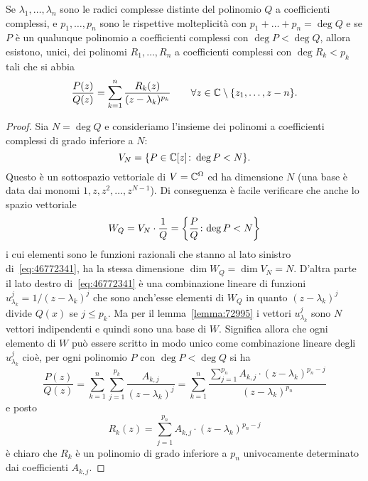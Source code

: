 \begin{theorem}
\label{th:fratti_semplici_complessi}%
%
%
%
Se $\lambda_1, \dots, \lambda_n$ sono le radici complesse
distinte del polinomio $Q$ a coefficienti complessi,
e $p_1,\dots, p_n$ sono le rispettive molteplicità
con $p_1 + \dots + p_n = \deg Q$
e se $P$ è un qualunque polinomio a coefficienti complessi
con $\deg P < \deg Q$,
allora esistono, unici, dei polinomi $R_1, \dots, R_n$
a coefficienti complessi con $\deg R_k < p_k$ tali che
si abbia
\begin{equation}\label{eq:46772341}
  \frac{P(z)}{Q(z)}
  = \sum_{k=1}^n \frac{R_k(z)}{(z-\lambda_k)^{p_k}}
  \qquad \forall z \in \mathbb C\setminus{\left\{ z_1,\dots,z-n \right\}}.
\end{equation}
\end{theorem}
%
\begin{proof}
Sia $N=\deg Q$ e consideriamo
l'insieme dei polinomi a coefficienti complessi
di grado inferiore a $N$:
\[
  V_N = {\left\{ P\in \mathbb C[z]\colon \deg P < N \right\}}.
\]
Questo è un sottospazio vettoriale di
$V=\mathbb C^\Omega$ ed ha dimensione
$N$ (una base è data dai monomi $1, z, z^2, \dots, z^{N-1}$).
Di conseguenza è facile verificare che anche lo spazio vettoriale
\[
  W_Q = V_N \cdot \frac{1}{Q} = {\left\{ \frac{P}{Q}\colon \text{$\deg P < N$} \right\}}
\]
i cui elementi sono le funzioni razionali che stanno al lato sinistro
di~\eqref{eq:46772341},
ha la stessa dimensione $\dim W_Q = \dim V_N = N$.
D'altra parte il lato destro di~\eqref{eq:46772341}
è una combinazione lineare di funzioni
$u_{\lambda_k}^j = 1/(z-\lambda_k)^j$ che sono
anch'esse elementi di $W_Q$ in quanto $(z-\lambda_k)^j$ divide $Q(x)$
se $j\le p_k$.
Ma per il lemma~\ref{lemma:72995} i vettori $u_{\lambda_k}^j$ sono
$N$ vettori indipendenti e quindi
sono una base di $W$.
Significa allora che ogni elemento di $W$ può
essere scritto in modo unico come combinazione lineare degli
$u_{\lambda_k}^j$ cioè, per ogni
polinomio $P$ con $\deg P < \deg Q$ si ha
\begin{equation}\label{eq:458934}
 \frac{P(z)}{Q(z)}
 = \sum_{k=1}^n \sum_{j=1}^{p_k} \frac{A_{k,j}}{(z-\lambda_k)^j}
 = \sum_{k=1}^n \frac{\displaystyle \sum_{j=1}^{p_n} A_{k,j}\cdot (z-\lambda_k)^{p_n-j}}{(z-\lambda_k)^{p_n}}
\end{equation}
e posto
\[
  R_k(z) = \sum_{j=1}^{p_n} A_{k,j}\cdot(z-\lambda_k)^{p_n-j}
\]
è chiaro che $R_k$ è un polinomio di grado inferiore a $p_n$
univocamente determinato dai coefficienti $A_{k,j}$.
\end{proof}


